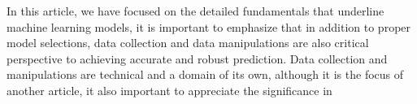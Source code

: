 
\par
In this article, we have focused on the detailed fundamentals that underline machine learning models, it is important to emphasize that in addition to proper model selections, data collection and data manipulations are also critical perspective to achieving accurate and robust prediction. Data collection and manipulations are technical and a domain of its own, although it is the focus of another article, it also important to appreciate the significance in 
\par 
